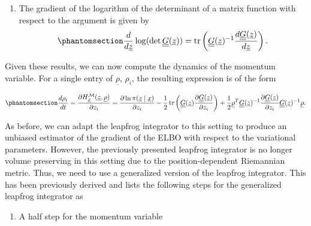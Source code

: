 \documentclass[
]{scrartcl}
\providecommand{\tightlist}{%
  \setlength{\itemsep}{0pt}\setlength{\parskip}{0pt}}\usepackage{longtable,booktabs,array}
\begin{document}
\begin{refsection}
\begin{enumerate}
\def\labelenumi{\arabic{enumi}.}
\setcounter{enumi}{2}
\tightlist
\item
  The gradient of the logarithm of the determinant of a matrix function
  with respect to the argument is given by
  \begin{equation}\phantomsection\label{eq-gradient-log-determinant-matrix}{  
  \frac{d}{d \underline{z}} 
  \log (\operatorname{det} \underline{\underline{G}}(\underline{z})) = 
  \operatorname{tr}\left(
   \underline{\underline{G}}(\underline{z})^{-1} 
   \frac{d \underline{\underline{G}}(\underline{z})}{d \underline{z}}
  \right).
  }\end{equation}
\end{enumerate}

Given these results, we can now compute the dynamics of the momentum
variable. For a single entry of \(\underline{\rho}\), \(\rho_i\), the
resulting expression is of the form

\begin{equation}\phantomsection\label{eq-gradient-hamiltonian-momentum-rhmc}{
\frac{d \rho_i}{d t} = 
\frac{
    \partial H_{\underline{x}}^{\mathcal{M}}(\underline{z}, \underline{\rho})
}{
    \partial z_i
} = 
\frac{\partial \ln \pi(\underline{z} \mid \underline{x})}{\partial z_i} -
\frac{1}{2} \operatorname{tr}\left(
    \underline{\underline{G}}(\underline{z}) 
    \frac{\partial \underline{\underline{G}}(\underline{z})}{\partial z_i}
\right) +
\frac{1}{2} 
\underline{\rho}^T 
\underline{\underline{G}}(\underline{z})^{-1} 
\frac{\partial \underline{\underline{G}}(\underline{z})}{\partial z_i} 
\underline{\underline{G}}(\underline{z})^{-1} \underline{\rho}.
}\end{equation}

As before, we can adapt the leapfrog integrator to this setting to
produce an unbiased estimator of the gradient of the ELBO with respect
to the variational parameters. However, the previously presented
leapfrog integrator is no longer volume preserving in this setting due
to the position-dependent Riemannian metric. Thus, we need to use a
generalized version of the leapfrog integrator. This has been previously
derived and \autocite{chadebec2020} lists the following steps for the
generalized leapfrog integrator as

\begin{enumerate}
\def\labelenumi{\arabic{enumi}.}
\tightlist
\item
  A half step for the momentum variable
\end{enumerate}


\end{refsection}
\end{document}

